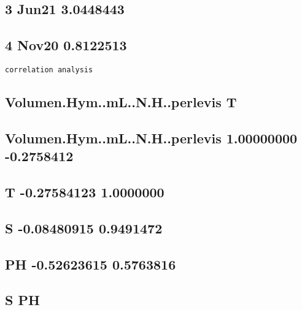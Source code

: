 \documentclass[
]{article}
\begin{document}
\hypertarget{jun21-3.0448443}{%
\subsection{3 Jun21 3.0448443}\label{jun21-3.0448443}}

\hypertarget{nov20-0.8122513}{%
\subsection{4 Nov20 0.8122513}\label{nov20-0.8122513}}

\begin{verbatim}
correlation analysis
\end{verbatim}

\hypertarget{volumen.hym..ml..n.h..perlevis-t}{%
\subsection{Volumen.Hym..mL..N.H..perlevis
T}\label{volumen.hym..ml..n.h..perlevis-t}}

\hypertarget{volumen.hym..ml..n.h..perlevis-1.00000000--0.2758412}{%
\subsection{Volumen.Hym..mL..N.H..perlevis 1.00000000
-0.2758412}\label{volumen.hym..ml..n.h..perlevis-1.00000000--0.2758412}}

\hypertarget{t--0.27584123-1.0000000}{%
\subsection{T -0.27584123 1.0000000}\label{t--0.27584123-1.0000000}}

\hypertarget{s--0.08480915-0.9491472}{%
\subsection{S -0.08480915 0.9491472}\label{s--0.08480915-0.9491472}}

\hypertarget{ph--0.52623615-0.5763816}{%
\subsection{PH -0.52623615 0.5763816}\label{ph--0.52623615-0.5763816}}

\hypertarget{s-ph}{%
\subsection{S PH}\label{s-ph}}
\end{document}
